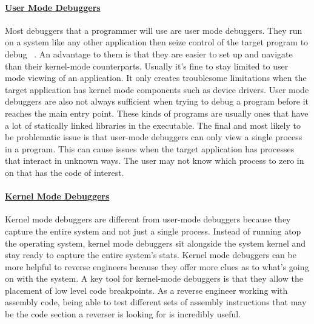 \documentclass[12pt]{article}
\begin{document}
\paragraph{\underline{User Mode Debuggers}}
Most debuggers that a programmer will use are user mode debuggers. They run on a system like any other application then seize control of the target program to debug ~\cite{Reversing}. An advantage to them is that they are easier to set up and navigate than their kernel-mode counterparts. Usually it’s fine to stay limited to user mode viewing of an application. It only creates troublesome limitations when the target application has kernel mode components such as device drivers. User mode debuggers are also not always sufficient when trying to debug a program before it reaches the main entry point. These kinds of programs are usually ones that have a lot of statically linked libraries in the executable. The final and most likely to be problematic issue is that user-mode debuggers can only view a single process in a program. This can cause issues when the target application has processes that interact in unknown ways. The user may not know which process to zero in on that has the code of interest.

\paragraph{\underline{Kernel Mode Debuggers}}
Kernel mode debuggers are different from user-mode debuggers because they capture the entire system and not just a single process. Instead of running atop the operating system, kernel mode debuggers sit alongside the system kernel and stay ready to capture the entire system’s stats. Kernel mode debuggers can be more helpful to reverse engineers because they offer more clues as to what’s going on with the system. A key tool for kernel-mode debuggers is that they allow the placement of low level code breakpoints. As a reverse engineer working with assembly code, being able to test different sets of assembly instructions that may be the code section a reverser is looking for is incredibly useful.
\end{document}
